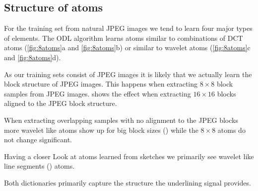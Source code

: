 \subsection{Structure of atoms}
For the training set from natural JPEG images we tend to learn four major types
of elements.
The ODL algorithm learns atoms similar to combinations of DCT atoms
(\ref{fig:8atoms}a and  \ref{fig:8atoms}b) or similar to wavelet atoms
(\ref{fig:8atoms}c and \ref{fig:8atoms}d).

As our training sets consist of JPEG images it is likely that we actually learn
the block structure of JPEG images. This happens when extracting
$8\times 8$ block samples from JPEG images.
 shows the effect when extracting $16\times 16$
blocks aligned to the JPEG block structure.

When extracting overlapping samples with no alignment to the JPEG
blocks more wavelet like atoms show up for big block sizes
() while the $8\times 8$ atoms do not change
significant. 

Having a closer Look at atoms learned from sketches we primarily see wavelet
like line segments () atoms.

Both dictionaries primarily capture the structure the underlining
signal provides. 

